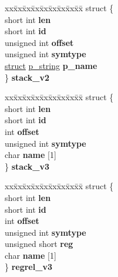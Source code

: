 \begin{DoxyCompactItemize}
\begin{tabbing}
\end{tabbing}\item 
\mbox{\label{unioncodeview__symbol_ae73b1f44ac5222883c234d6265ab9269}} 
\begin{tabbing}
xx\=xx\=xx\=xx\=xx\=xx\=xx\=xx\=xx\=\kill
struct \{\\
\>short int {\bfseries len}\\
\>short int {\bfseries id}\\
\>unsigned int {\bfseries offset}\\
\>unsigned int {\bfseries symtype}\\
\>\hyperlink{interfacestruct}{struct} \hyperlink{structp__string}{p\_string} {\bfseries p\_name}\\
\} {\bfseries stack\_v2}\\

\end{tabbing}\item 
\mbox{\label{unioncodeview__symbol_a30c03a8a037af4437b2f3bae27025e82}} 
\begin{tabbing}
xx\=xx\=xx\=xx\=xx\=xx\=xx\=xx\=xx\=\kill
struct \{\\
\>short int {\bfseries len}\\
\>short int {\bfseries id}\\
\>int {\bfseries offset}\\
\>unsigned int {\bfseries symtype}\\
\>char {\bfseries name} \mbox{[}1\mbox{]}\\
\} {\bfseries stack\_v3}\\

\end{tabbing}\item 
\mbox{\label{unioncodeview__symbol_a37cd3d47590377cba92b1f082b3a4ce0}} 
\begin{tabbing}
xx\=xx\=xx\=xx\=xx\=xx\=xx\=xx\=xx\=\kill
struct \{\\
\>short int {\bfseries len}\\
\>short int {\bfseries id}\\
\>int {\bfseries offset}\\
\>unsigned int {\bfseries symtype}\\
\>unsigned short {\bfseries reg}\\
\>char {\bfseries name} \mbox{[}1\mbox{]}\\
\} {\bfseries regrel\_v3}\\


\end{tabbing}
\end{DoxyCompactItemize}

